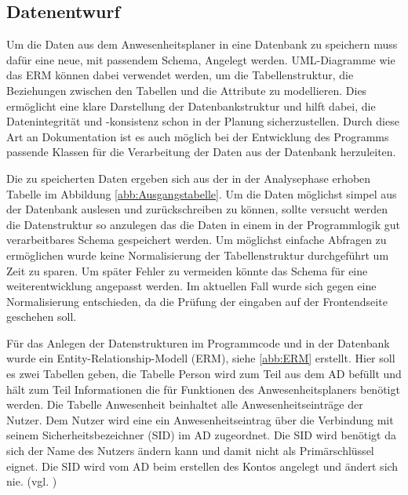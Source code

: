 \subsection{Datenentwurf}
\label{sec:Datenentwurf}
Um die Daten aus dem Anwesenheitsplaner in eine Datenbank zu speichern muss dafür eine neue, mit passendem Schema, Angelegt werden. UML-Diagramme wie das ERM können dabei verwendet werden, um die Tabellenstruktur, die Beziehungen zwischen den Tabellen und die Attribute zu modellieren. Dies ermöglicht eine klare Darstellung der Datenbankstruktur und hilft dabei, die Datenintegrität und -konsistenz schon in der Planung sicherzustellen. Durch diese Art an Dokumentation ist es auch möglich bei der Entwicklung des Programms passende Klassen für die Verarbeitung der Daten aus der Datenbank herzuleiten.

Die zu speicherten Daten ergeben sich aus der in der Analysephase erhoben Tabelle im Abbildung \ref{abb:Ausgangstabelle}. Um die Daten möglichst simpel aus der Datenbank auslesen und zurückschreiben zu können, sollte versucht werden die Datenstruktur so anzulegen das die Daten in einem in der Programmlogik gut verarbeitbares Schema gespeichert werden. Um möglichst einfache Abfragen zu ermöglichen wurde keine Normalisierung der Tabellenstruktur durchgeführt um Zeit zu sparen. Um später Fehler zu vermeiden könnte das Schema für eine weiterentwicklung angepasst werden. Im aktuellen Fall wurde sich gegen eine Normalisierung entschieden, da die Prüfung der eingaben auf der Frontendseite geschehen soll.

Für das Anlegen der Datenstrukturen im Programmcode und in der Datenbank wurde ein Entity-Relationship-Modell (ERM), siehe \ref{abb:ERM} erstellt. Hier soll es zwei Tabellen geben, die Tabelle Person wird zum Teil aus dem AD befüllt und hält zum Teil Informationen die für Funktionen des Anwesenheitsplaners benötigt werden. Die Tabelle Anwesenheit beinhaltet alle Anwesenheitseinträge der Nutzer. Dem Nutzer wird eine ein Anwesenheitseintrag über die Verbindung mit seinem Sicherheitsbezeichner (SID) im AD zugeordnet. Die SID wird benötigt da sich der Name des Nutzers ändern kann und damit nicht als Primärschlüssel eignet. Die SID wird vom AD beim erstellen des Kontos angelegt und ändert sich nie. (vgl. \cite{sid})

